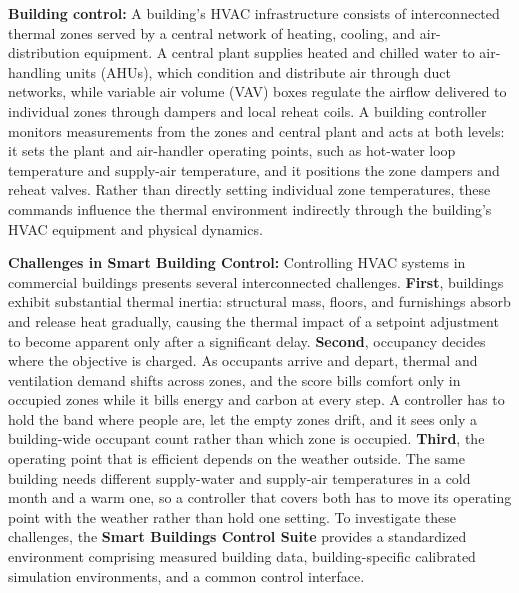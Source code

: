 \documentclass{article}
\begin{document}
\textbf{Building control:} A building's HVAC infrastructure consists of interconnected thermal zones served by a central network of heating, cooling, and air-distribution equipment. A central plant supplies heated and chilled water to air-handling units (AHUs), which condition and distribute air through duct networks, while variable air volume (VAV) boxes regulate the airflow delivered to individual zones through dampers and local reheat coils. A building controller monitors measurements from the zones and central plant and acts at both levels: it sets the plant and air-handler operating points, such as hot-water loop temperature and supply-air temperature, and it positions the zone dampers and reheat valves. Rather than directly setting individual zone temperatures, these commands influence the thermal environment indirectly through the building's HVAC equipment and physical dynamics.

\textbf{Challenges in Smart Building Control:} Controlling HVAC systems in commercial buildings presents several interconnected challenges. \textbf{First}, buildings exhibit substantial thermal inertia: structural mass, floors, and furnishings absorb and release heat gradually, causing the thermal impact of a setpoint adjustment to become apparent only after a significant delay. \textbf{Second}, occupancy decides where the objective is charged. As occupants arrive and depart, thermal and ventilation demand shifts across zones, and the score bills comfort only in occupied zones while it bills energy and carbon at every step. A controller has to hold the band where people are, let the empty zones drift, and it sees only a building-wide occupant count rather than which zone is occupied. \textbf{Third}, the operating point that is efficient depends on the weather outside. The same building needs different supply-water and supply-air temperatures in a cold month and a warm one, so a controller that covers both has to move its operating point with the weather rather than hold one setting. To investigate these challenges, the \textbf{Smart Buildings Control Suite} \citep{goldfeder2024smart} provides a standardized environment comprising measured building data, building-specific calibrated simulation environments, and a common control interface.
\end{document}
